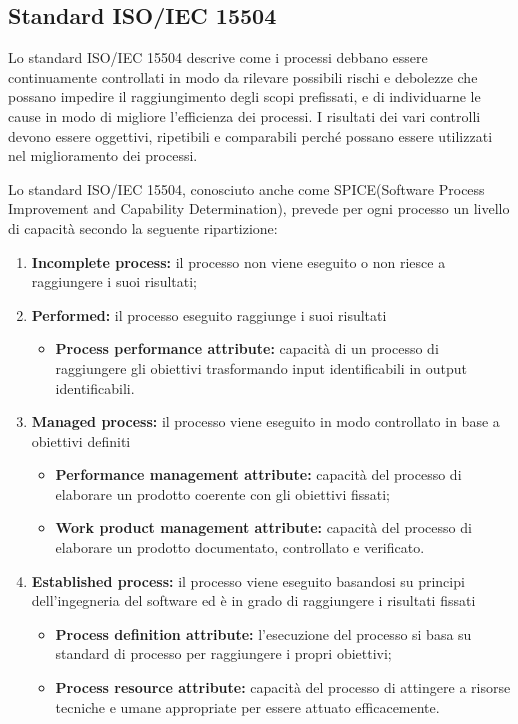 \subsection{Standard ISO/IEC 15504}\label{15504}
\begin{flushleft}
Lo standard ISO/IEC 15504 descrive come i processi debbano essere continuamente controllati in modo da rilevare possibili rischi e debolezze che possano impedire il raggiungimento degli scopi prefissati, e di individuarne le cause in modo di migliore l'efficienza dei processi. I risultati dei vari controlli devono essere oggettivi, ripetibili e comparabili perché possano essere utilizzati nel miglioramento dei processi.

Lo standard ISO/IEC 15504, conosciuto anche come SPICE(Software Process Improvement and Capability Determination), prevede per ogni processo un livello di capacità secondo la seguente ripartizione:

\begin{enumerate}[label*=\arabic*]
	\item \textbf{Incomplete process:} il processo non viene eseguito o non riesce a raggiungere i suoi risultati;
	
	\item \textbf{Performed:} il processo eseguito raggiunge i suoi risultati
		\begin{itemize}
			\item \textbf{Process performance attribute:} capacità di un processo di raggiungere gli obiettivi trasformando input identificabili in output identificabili.
		\end{itemize}
		
	\item \textbf{Managed process:} il processo viene eseguito in modo controllato in base a obiettivi definiti
		\begin{itemize}
			\item \textbf{Performance management attribute:} capacità del processo di elaborare un prodotto coerente con gli obiettivi fissati;
			\item \textbf{Work product management attribute:} capacità del processo di elaborare un prodotto documentato, controllato e verificato.
		\end{itemize}
		
		
	\item \textbf{Established process:} il processo viene eseguito basandosi su principi dell'ingegneria del software ed è in grado di raggiungere i risultati fissati
		\begin{itemize}
			\item \textbf{Process definition attribute:} l'esecuzione del processo si basa su standard di processo per raggiungere i propri obiettivi;
			\item \textbf{Process resource attribute:} capacità del processo di attingere a risorse tecniche e umane appropriate per essere attuato efficacemente.
		\end{itemize}
		

\end{enumerate}
\end{flushleft}
